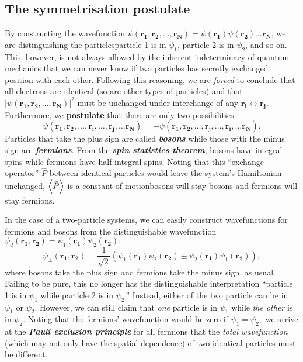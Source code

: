 \documentclass{article}
\theoremstyle{nonumberplain}
\begin{document}
\subsection{The symmetrisation postulate}
By constructing the wavefunction $\psi(\mathbf{r_1}, \mathbf{r_2},\ldots ,\mathbf{r_N}  ) = \psi (\mathbf{r_1} ) \psi (\mathbf{r_2} )\ldots \mathbf{r_N}  $, we are distinguishing the particles\textemdash particle 1 is in $\psi_1$, particle 2 is in $\psi_2$, and so on. This, however, is not always allowed by the inherent indeterminacy of quantum mechanics that we can never know if two particles has secretly exchanged position with each other. Following this reasoning, we are \textit{forced} to conclude that all electrons are identical (so are other types of particles) and that $\left\vert \psi(\mathbf{r_1}, \mathbf{r_2},\ldots ,\mathbf{r_N} )  \right\vert ^2$ must be unchanged under interchange of any $\mathbf{r_i} \longleftrightarrow \mathbf{r_j}. $ Furthermore, we \textbf{postulate} that there are only two possibilities: 
\[
    \psi(\mathbf{r_1}, \mathbf{r_2}, \ldots  , \mathbf{r_i}, \ldots  , \mathbf{r_j}, \ldots  \mathbf{r_N}     )
    = \pm \psi(\mathbf{r_1}, \mathbf{r_2}, \ldots  , \mathbf{r_j}, \ldots  , \mathbf{r_i}, \ldots  \mathbf{r_N}  ). 
\]
Particles that take the plus sign are called \textit{\textbf{bosons}} while those with the minus sign are \textit{\textbf{fermions}}. From the \textit{\textbf{spin statistics theorem}}, bosons have integral spins while fermions have half-integral spins. Noting that this ``exchange operator'' $\hat{P} $ between identical particles would leave the system's Hamiltonian unchanged, $\expval{\hat{P} }$ is a constant of motion\textemdash bosons will stay bosons and fermions will stay fermions. 

In the case of a two-particle systems, we can easily construct wavefunctions for fermions and bosons from the distinguishable wavefunction 
\(
    \psi_d(\mathbf{r_1}, \mathbf{r_2}  ) = \psi_1 (\mathbf{r_1} ) \psi_2 (\mathbf{r_2} ):   
\) 
\[
    \psi_{\pm}(\mathbf{r_1}, \mathbf{r_2}  )
    = \frac{1}{\sqrt{2} } \left( 
        \psi_1 (\mathbf{r_1} ) \psi_2 (\mathbf{r_2} ) \pm
        \psi_2 (\mathbf{r_1} ) \psi_1 (\mathbf{r_2} )
    \right),
\]
where bosons take the plus sign and fermions take the minus sign, as usual. Failing to be pure, this no longer has the distinguishable interpretation ``particle 1 is in $\psi_1 $ while particle 2 is in $\psi_2$.'' Instead, either of the two particle can be in $\psi_1$ or $\psi_2$. However, we can still claim that \textit{one} particle is in $\psi_1$ while \textit{the other} is in $\psi_2$. Noting that the fermions' wavefunction would be zero if $\psi_1 = \psi_2,$ we arrive at the \textit{\textbf{Pauli exclusion principle}} for all fermions that the \textit{total wavefunction} (which may not only have the spatial dependence) of two identical particles must be different.
\end{document}
